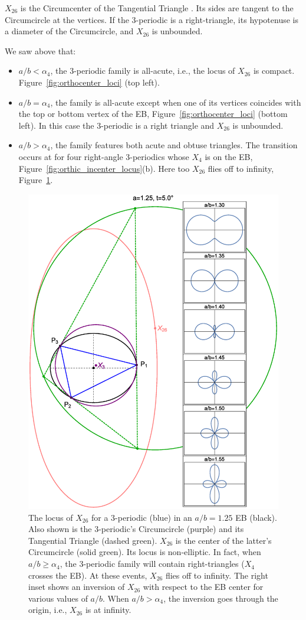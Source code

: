 $X_{26}$ is the Circumcenter of the Tangential Triangle \cite{mw}. Its sides are tangent to the Circumcircle at the vertices. If the 3-periodic is a right-triangle, its hypotenuse is a diameter of the Circumcircle, and $X_{26}$ is unbounded.

We saw above that:

\begin{itemize}
\item $a/b<\alpha_4$, the 3-periodic family is all-acute, i.e., the locus of $X_{26}$ is compact. Figure~\ref{fig:orthocenter_loci} (top left).
\item $a/b=\alpha_4$, the family is all-acute except when one of its vertices coincides with the top or bottom vertex of the EB, Figure~\ref{fig:orthocenter_loci} (bottom left). In this case the 3-periodic is a right triangle and $X_{26}$ is unbounded.
\item $a/b>\alpha_4$, the family features both acute and obtuse triangles. The transition occurs at for four right-angle 3-periodics whose $X_4$ is on the EB, Figure~\ref{fig:orthic_incenter_locus}(b). Here too $X_{26}$ flies off to infinity, Figure~\ref{fig:x26}.
\end{itemize}

\begin{figure}
    \centering
    \includegraphics[width=.8\textwidth]{pics/1060_x26.eps}
    \caption{The locus of $X_{26}$ for a 3-periodic (blue) in an $a/b=1.25$ EB (black). Also shown is the 3-periodic's Circumcircle (purple) and its Tangential Triangle \cite{mw} (dashed green). $X_{26}$ is the center of the latter's Circumcircle (solid green). Its locus is non-elliptic. In fact, when $a/b{\geq}\alpha_4$, the 3-periodic family will contain right-triangles ($X_4$ crosses the EB). At these events, $X_{26}$ flies off to infinity. The right inset shows an inversion of $X_{26}$  with respect to the EB center for various values of $a/b$. When $a/b>\alpha_4$, the inversion goes through the origin, i.e., $X_{26}$ is at infinity.}
    \label{fig:x26}
\end{figure}

